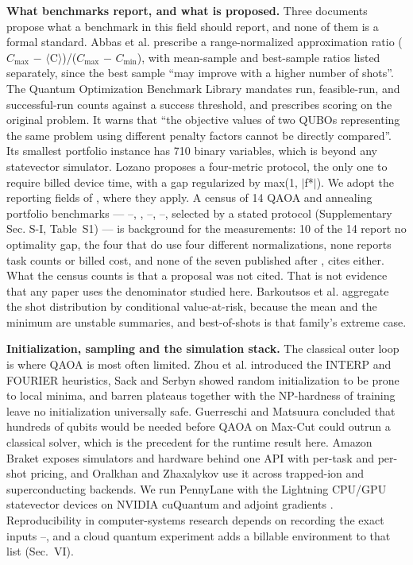 \documentclass[journal]{IEEEtran}
\begin{document}
\textbf{What benchmarks report, and what is proposed.} Three documents propose what a benchmark in this field should report, and none of them is a formal standard. Abbas et al. \cite{ref22} prescribe a range-normalized approximation ratio ($C_{\mathrm{max}}$ $-$ $\langle$C$\rangle$)/($C_{\mathrm{max}}$ $-$ $C_{\mathrm{min}}$), with mean-sample and best-sample ratios listed separately, since the best sample ``may improve with a higher number of shots''. The Quantum Optimization Benchmark Library \cite{ref23} mandates run, feasible-run, and successful-run counts against a success threshold, and prescribes scoring on the original problem. It warns that ``the objective values of two QUBOs representing the same problem using different penalty factors cannot be directly compared''. Its smallest portfolio instance has 710 binary variables, which is beyond any statevector simulator. Lozano \cite{ref24} proposes a four-metric protocol, the only one to require billed device time, with a gap regularized by max(1, $|$f*$|$). We adopt the reporting fields of \cite{ref22}, \cite{ref23} where they apply. A census of 14 QAOA and annealing portfolio benchmarks --- \cite{ref8}--\cite{ref10}, \cite{ref13}, \cite{ref15}--\cite{ref18}, \cite{ref25}--\cite{ref30}, selected by a stated protocol (Supplementary Sec. S-I, Table~S1) --- is background for the measurements: 10 of the 14 report no optimality gap, the four that do use four different normalizations, none reports task counts or billed cost, and none of the seven published after \cite{ref22}, \cite{ref23} cites either. What the census counts is that a proposal was not cited. That is not evidence that any paper uses the denominator studied here. Barkoutsos et al. \cite{ref31} aggregate the shot distribution by conditional value-at-risk, because the mean and the minimum are unstable summaries, and best-of-shots is that family's extreme case.


\textbf{Initialization, sampling and the simulation stack.} The classical outer loop is where QAOA is most often limited. Zhou et al. \cite{ref32} introduced the INTERP and FOURIER heuristics, Sack and Serbyn \cite{ref33} showed random initialization to be prone to local minima, and barren plateaus \cite{ref34} together with the NP-hardness of training \cite{ref35} leave no initialization universally safe. Guerreschi and Matsuura \cite{ref36} concluded that hundreds of qubits would be needed before QAOA on Max-Cut could outrun a classical solver, which is the precedent for the runtime result here. Amazon Braket \cite{ref37} exposes simulators and hardware behind one API with per-task and per-shot pricing, and Oralkhan and Zhaxalykov \cite{ref26} use it across trapped-ion and superconducting backends. We run PennyLane \cite{ref38} with the Lightning CPU/GPU statevector devices on NVIDIA cuQuantum \cite{ref39} and adjoint gradients \cite{ref40}. Reproducibility in computer-systems research depends on recording the exact inputs \cite{ref41}--\cite{ref43}, and a cloud quantum experiment adds a billable environment to that list (Sec.~VI).
\end{document}
